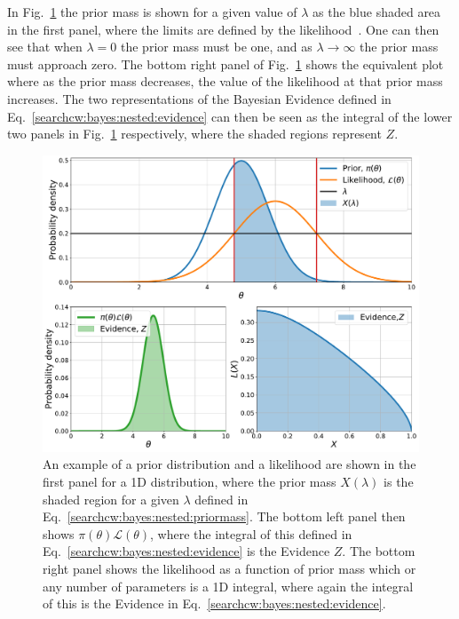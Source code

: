 In Fig.~\ref{cwinto:bayes:nestedsampling:plots} the prior mass is shown for a
given value of $\lambda$ as the blue shaded area in the first panel, where the
limits are defined by the likelihood~.
One can then see that when $\lambda= 0$ the prior mass must be one, and as $\lambda \rightarrow \infty$ the prior mass must approach zero. The bottom right panel of Fig.~\ref{cwinto:bayes:nestedsampling:plots} shows the equivalent plot where as the prior mass decreases, the value of the likelihood at that prior mass increases.
The two representations of the Bayesian Evidence defined in Eq.~\ref{searchcw:bayes:nested:evidence} can then be seen as the integral of the lower two panels in Fig.~\ref{cwinto:bayes:nestedsampling:plots} respectively, where the shaded regions represent $Z$. 
%
\begin{figure}[ht]
	\centering
	\includegraphics[width=0.8\linewidth]{C2_cw/nested_plots.pdf}
        \caption[Nested sampling]{An example of a prior distribution and a
likelihood are shown in the first panel for a 1D distribution, where the prior
mass $X(\lambda)$ is the shaded region for a given $\lambda$ defined in
Eq.~\ref{searchcw:bayes:nested:priormass}. The bottom left panel then shows
$\pi(\theta)\mathcal{L}(\theta)$, where the integral of this defined in
Eq.~\ref{searchcw:bayes:nested:evidence} is the Evidence $Z$. The bottom right
panel shows the likelihood as a function of prior mass which or any number of
parameters is a 1D integral, where again the integral of this is the Evidence
in Eq.~\ref{searchcw:bayes:nested:evidence}.~}
\label{cwinto:bayes:nestedsampling:plots}

\end{figure}
%

